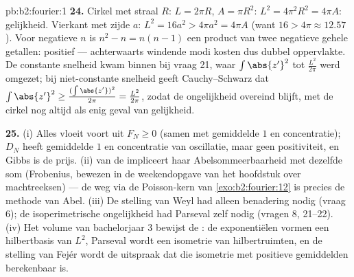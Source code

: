 \begin{solution}{pb:b2:fourier:1}
\textbf{24.} Cirkel met straal $R$: $L = 2\pi R$, $A = \pi R^2$:
$L^2 = 4\pi^2R^2 = 4\pi A$: gelijkheid. Vierkant met zijde $a$:
$L^2 = 16a^2 > 4\pi a^2 = 4\pi A$ (want $16 > 4\pi \approx
12.57$). Voor negatieve $n$ is $n^2 - n = n(n - 1)$ een product
van twee negatieve gehele getallen: positief --- achterwaarts
windende modi kosten dus dubbel oppervlakte. De constante snelheid
kwam binnen bij vraag 21, waar $\int\abs{z'}^2$ tot
$\frac{L^2}{2\pi}$ werd omgezet; bij niet-constante snelheid geeft
Cauchy--Schwarz dat $\int\abs{z'}^2 \geq
\frac{(\int\abs{z'})^2}{2\pi} = \frac{L^2}{2\pi}$, zodat de
ongelijkheid overeind blijft, met de cirkel nog altijd als enig
geval van gelijkheid.

\textbf{25.} (i) Alles vloeit voort uit $F_N \geq 0$ (samen met
gemiddelde $1$ en concentratie); $D_N$ heeft gemiddelde $1$ en
concentratie van oscillatie, maar geen positiviteit, en Gibbs is de
prijs. (ii)  van de  impliceert
haar Abelsommeerbaarheid met dezelfde som (Frobenius, bewezen in de
weekendopgave van het hoofdstuk over machtreeksen) --- de weg via
de Poisson-kern van \cref{exo:b2:fourier:12} is precies de methode
van Abel. (iii) De stelling van Weyl had alleen 
benadering nodig (vraag 6); de isoperimetrische ongelijkheid had
Parseval zelf nodig (vragen 8, 21--22). (iv) Het volume van
bachelorjaar 3 bewijst de : de exponentiëlen vormen
een hilbertbasis van $L^2$, Parseval wordt een isometrie van
hilbertruimten, en de stelling van Fejér wordt de uitspraak dat
die isometrie met positieve gemiddelden berekenbaar is.
\end{solution}
